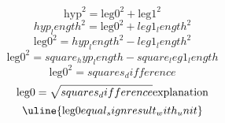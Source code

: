 \[\text{{{hyp}}}^{{2}}=\text{{{leg0}}}^{{2}}+\text{{{leg1}}}^{{2}}\]
\[{hyp_length}^{{2}}=\text{{{leg0}}}^{{2}}+{leg1_length}^{{2}}\]
\[\text{{{leg0}}}^{{2}}={hyp_length}^{{2}}-{leg1_length}^{{2}}\]
\[\text{{{leg0}}}^{{2}}={square_hyp_length}-{square_leg1_length}\]
\[\text{{{leg0}}}^{{2}}={squares_difference}\]
\[\text{{{leg0}}}=\sqrt{{\mathstrut {squares_difference}}}\text{{{explanation}}}\]
\[\uline{{\text{{{leg0}}}{equal_sign}{result_with_unit}}}\]